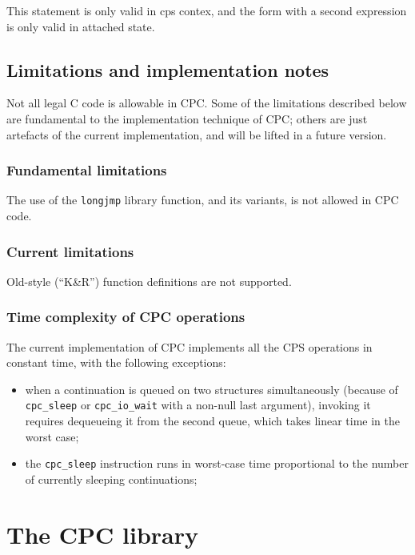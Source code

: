 \documentclass[a4paper]{report}
\begin{document}
This statement is only valid in cps contex, and the form with a second
expression is only valid in attached state.

\section{Limitations and implementation notes}

Not all legal C code is allowable in CPC.  Some of the limitations
described below are fundamental to the implementation technique of
CPC; others are just artefacts of the current implementation, and will
be lifted in a future version.

\subsection{Fundamental limitations}

The use of the {\tt longjmp} library function, and its variants, is
not allowed in CPC code.

\subsection{Current limitations}

Old-style (``K\&R'') function definitions are not supported.

\subsection{Time complexity of CPC operations}

The current implementation of CPC implements all the CPS operations in
constant time, with the following exceptions:
\begin{itemize} 
\item when a continuation is queued on two structures simultaneously
  (because of {\tt cpc\_sleep} or {\tt cpc\_io\_wait} with a non-null
  last argument), invoking it requires dequeueing it from the second
  queue, which takes linear time in the worst case;
\item the {\tt cpc\_sleep} instruction runs in worst-case time
  proportional to the number of currently sleeping continuations;
\end{itemize}

\chapter{The CPC library}
\end{document}
